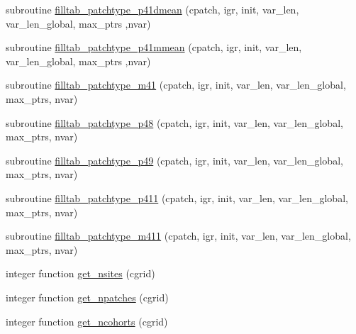 \begin{DoxyCompactItemize}
\item 
subroutine \hyperlink{namespaceed__state__vars_a951f992e438684b78a72bd758f70730e}{filltab\+\_\+patchtype\+\_\+p41dmean} (cpatch, igr, init, var\+\_\+len, var\+\_\+len\+\_\+global, max\+\_\+ptrs                                                                                                                                                                   ,nvar)
\item 
subroutine \hyperlink{namespaceed__state__vars_aac151ba29df61cb8a458cb9601ba74a3}{filltab\+\_\+patchtype\+\_\+p41mmean} (cpatch, igr, init, var\+\_\+len, var\+\_\+len\+\_\+global, max\+\_\+ptrs                                                                                                                                                                   ,nvar)
\item 
subroutine \hyperlink{namespaceed__state__vars_a326b7df2068b9faa5fc1ea535c86efe2}{filltab\+\_\+patchtype\+\_\+m41} (cpatch, igr, init, var\+\_\+len, var\+\_\+len\+\_\+global, max\+\_\+ptrs, nvar)
\item 
subroutine \hyperlink{namespaceed__state__vars_a5d63e58eeaff5d95d688b551f909aff4}{filltab\+\_\+patchtype\+\_\+p48} (cpatch, igr, init, var\+\_\+len, var\+\_\+len\+\_\+global, max\+\_\+ptrs, nvar)
\item 
subroutine \hyperlink{namespaceed__state__vars_aacba61eceab235a0ea8a293671b4d340}{filltab\+\_\+patchtype\+\_\+p49} (cpatch, igr, init, var\+\_\+len, var\+\_\+len\+\_\+global, max\+\_\+ptrs, nvar)
\item 
subroutine \hyperlink{namespaceed__state__vars_afa3fe02474e668980d731221824ae0ab}{filltab\+\_\+patchtype\+\_\+p411} (cpatch, igr, init, var\+\_\+len, var\+\_\+len\+\_\+global, max\+\_\+ptrs, nvar)
\item 
subroutine \hyperlink{namespaceed__state__vars_ad37021d612198bd02a104790ed58446c}{filltab\+\_\+patchtype\+\_\+m411} (cpatch, igr, init, var\+\_\+len, var\+\_\+len\+\_\+global, max\+\_\+ptrs, nvar)
\item 
integer function \hyperlink{namespaceed__state__vars_a71180ecf4c468babd534e14d280a688b}{get\+\_\+nsites} (cgrid)
\item 
integer function \hyperlink{namespaceed__state__vars_a87bcc335f1f8acbb6c87d33101c60e61}{get\+\_\+npatches} (cgrid)
\item 
integer function \hyperlink{namespaceed__state__vars_a3bec61b0abda2eb04c29f131b1130f37}{get\+\_\+ncohorts} (cgrid)
\end{DoxyCompactItemize}
